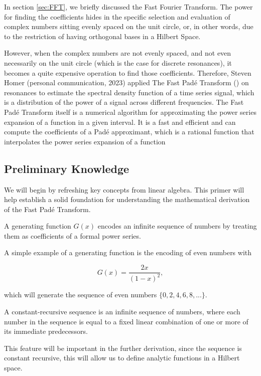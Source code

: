 In section \ref{sec:FFT}, we briefly discussed the Fast Fourier Transform. The power for finding the coefficients hides in the specific selection and evaluation of complex numbers sitting evenly spaced on the unit circle, or, in other words, due to the restriction of having orthogonal bases in a Hilbert Space. 

However, when the complex numbers are not evenly spaced, and not even necessarily on the unit circle (which is the case for discrete resonances), it becomes a quite expensive operation to find those coefficients. Therefore, Steven Homer (personal communication, 2023) applied The Fast Padé Transform (\cite{belkic_signal_2019}) on resonances to estimate the spectral density function of a time series signal, which is a distribution of the power of a signal across different frequencies. The Fast Padé Transform itself is a numerical algorithm for approximating the power series expansion of a function in a given interval. It is a fast and efficient and can compute the coefficients of a Padé approximant, which is a rational function that interpolates the power series expansion of a function


\subsection{Preliminary Knowledge}
We will begin by refreshing key concepts from linear algebra. This primer will help establish a solid foundation for understanding the mathematical derivation of the Fast Padé Transform.

\begin{definition}
A generating function $G(x)$ encodes an infinite sequence of numbers by treating them as coefficients of a formal power series. 
\end{definition}
A simple example of a generating function is the encoding of even numbers with 

\begin{equation}
    G(x) = \frac{2x}{(1-x)^2}, 
\end{equation}

which will generate the sequence of even numbers $\{0, 2, 4, 6, 8, ...\}$. 

\begin{definition}
A constant-recursive sequence is an infinite sequence of numbers, where each number in the sequence is equal to a fixed linear combination of one or more of its immediate predecessors.
\end{definition}
This feature will be important in the further derivation, since the sequence is constant recursive, this will allow us to define analytic functions in a Hilbert space.


